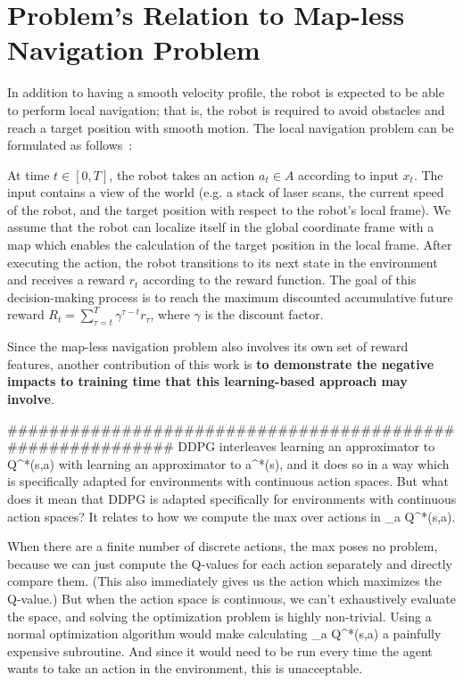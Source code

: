 \section{Problem's Relation to Map-less Navigation Problem}
In addition to having a smooth velocity profile, the robot is expected to be able to perform local navigation; that is, the robot is required to avoid obstacles and reach a target position with smooth motion. The local navigation problem can be formulated as follows~\cite{xie_learning_2018}:

At time $t \in [0, T]$, the robot takes an action $a_{t} \in A$ according to input $x_{t}$. The input contains a view of the world (e.g. a stack of laser scans, the current speed of the robot, and the target position with respect to the robot's local frame). We assume that the robot can localize itself in the global coordinate frame with a map which enables the calculation of the target position in the local frame. After executing the action, the robot transitions to its next state in the environment and receives a reward $r_{t}$ according to the reward function. The goal of this decision-making process is to reach the maximum discounted accumulative future reward $R_{t} = \sum_{\tau = t}^{T} \gamma^{\tau - t} r_{\tau}$, where $\gamma$ is the discount factor.

Since the map-less navigation problem also involves its own set of reward features, another contribution of this work is \textbf{to demonstrate the negative impacts to training time that this learning-based approach may involve}.



###########################################################
DDPG interleaves learning an approximator to Q^*(s,a) with learning an approximator to a^*(s), and it does so in a way which is specifically adapted for environments with continuous action spaces. But what does it mean that DDPG is adapted specifically for environments with continuous action spaces? It relates to how we compute the max over actions in \max_a Q^*(s,a).

When there are a finite number of discrete actions, the max poses no problem, because we can just compute the Q-values for each action separately and directly compare them. (This also immediately gives us the action which maximizes the Q-value.) But when the action space is continuous, we can't exhaustively evaluate the space, and solving the optimization problem is highly non-trivial. Using a normal optimization algorithm would make calculating \max_a Q^*(s,a) a painfully expensive subroutine. And since it would need to be run every time the agent wants to take an action in the environment, this is unacceptable.

